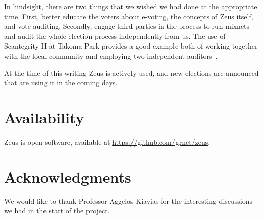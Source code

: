 \documentclass[jets]{usenixjournal}
\begin{document}
In hindsight, there are two things that we wished we had done at the
appropriate time. First, better educate the voters about e-voting, the
concepts of Zeus itself, and vote auditing. Secondly, engage third
parties in the process to run mixnets and audit the whole election
process independently from us. The use of Scantegrity II at Takoma
Park provides a good example both of working together with the local
community and employing two independent auditors~\cite{carback:2010}.

At the time of this writing Zeus is actively used, and new elections
are announced that are using it in the coming days.

\section{Availability}

Zeus is open software, available at \url{https://github.com/grnet/zeus}.

\section{Acknowledgments}

We would like to thank Professor Aggelos Kiayias for the interesting
discussions we had in the start of the project.

{\footnotesize


}
\end{document}
